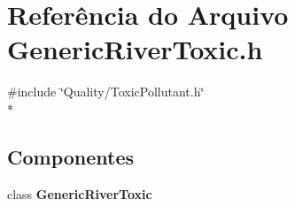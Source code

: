 \section{Referência do Arquivo Generic\+River\+Toxic.\+h}
\label{_generic_river_toxic_8h}
{\ttfamily \#include \char`\"{}Quality/\+Toxic\+Pollutant.\+h\char`\"{}}\\*
\subsection*{Componentes}
\begin{DoxyCompactItemize}
\item 
class {\bf Generic\+River\+Toxic}
\end{DoxyCompactItemize}
